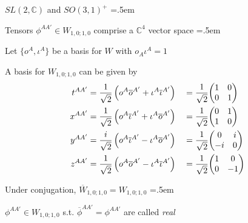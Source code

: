 \documentclass[xcolor={dvipsnames}]{beamer}
\let\olditemize=\itemize
\let\endolditemize=\enditemize
\renewenvironment{itemize}{\olditemize \itemsep=.5em }{\endolditemize}
\begin{document}
\begin{frame}{$SL(2, \mathbb{C})$ and $SO(3, 1)^+$}
    \begin{itemize}
        \item<1-> Tensors $\phi^{AA'} \in W_{1,0;1,0}$ comprise a $\mathbb{C}^4$ vector space
        \begin{itemize}
            \item<2-> Let $\{o^A, \iota^A \}$ be a basis for $W$ with $o_A\iota^A = 1$
            \item<3-> A basis for $W_{1,0;1,0}$ can be given by
            \begin{align*}
                t^{AA'} &= \frac{1}{\sqrt{2}}\left(o^A\overline{o}^{A'} + \iota^A\overline{\iota}^{A'}\right) &&= \frac{1}{\sqrt{2}}\mqty(1&0\\0&1) \\
                x^{AA'} &= \frac{1}{\sqrt{2}}\left(o^A\overline{\iota}^{A'} + \iota^A\overline{o}^{A'}\right) &&= \frac{1}{\sqrt{2}}\mqty(0&1\\1&0) \\
                y^{AA'} &= \frac{i}{\sqrt{2}}\left(o^A\overline{\iota}^{A'} - \iota^A\overline{o}^{A'}\right) &&= \frac{1}{\sqrt{2}}\mqty(0&i\\-i&0) \\
                z^{AA'} &= \frac{1}{\sqrt{2}}\left(o^A\overline{o}^{A'} - \iota^A\overline{\iota}^{A'}\right) &&= \frac{1}{\sqrt{2}}\mqty(1&0\\0&-1)
            \end{align*}
        \end{itemize}
        \vspace{-1em}
        \item<4-> Under conjugation, $\overline{W}_{1,0;1,0} = W_{1,0;1,0}$
        \begin{itemize}
            \item<5-> $\phi^{AA'} \in W_{1,0;1,0}$ s.t. $\overline{\phi}^{AA'} = \phi^{AA'}$ are called \textit{real}
        \end{itemize}
    \end{itemize}
\end{frame}
\end{document}

